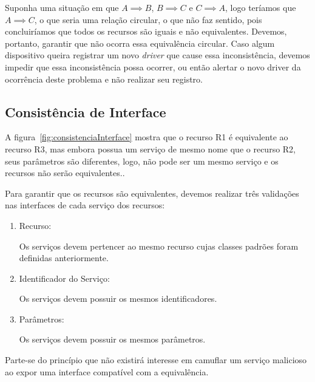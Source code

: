 Suponha uma situação em que $A \implies B$, $B \implies C$ e $C \implies A$, logo teríamos que $A \implies C$, o que seria uma relação circular, o que não faz sentido, pois concluiríamos que todos os recursos são iguais e não equivalentes. Devemos, portanto, garantir que não ocorra essa equivalência circular. Caso algum dispositivo queira registrar um novo \emph{driver} que cause essa inconsistência, devemos impedir que essa inconsistência possa ocorrer, ou então alertar o novo driver da ocorrência deste problema e não realizar seu registro. 

\subsection{Consistência de Interface}

	A figura~\ref{fig:consistenciaInterface} mostra que o recurso R1 é equivalente ao recurso R3, mas embora possua um serviço de mesmo nome que o recurso R2,  seus parâmetros são diferentes, logo, não pode ser um mesmo serviço e os recursos não serão equivalentes..
	
	Para garantir que os recursos são equivalentes, devemos realizar três validações nas interfaces de cada serviço dos recursos:
	\begin{enumerate}
		\item Recurso:
			
			Os serviços devem pertencer ao mesmo recurso cujas classes padrões foram definidas anteriormente.
		
		\item Identificador do Serviço:

			Os serviços devem possuir os mesmos identificadores.

		\item Parâmetros:

			Os serviços devem possuir os mesmos parâmetros.
	\end{enumerate}

	Parte-se do princípio que não existirá interesse em camuflar um serviço malicioso ao expor uma interface compatível com a equivalência.

